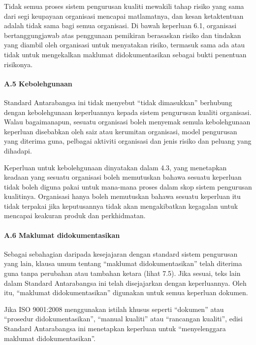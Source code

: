 \documentclass[
]{article}
\begin{document}
Tidak semua proses sistem pengurusan kualiti mewakili tahap risiko yang
sama dari segi keupayaan organisasi mencapai matlamatnya, dan kesan
ketaktentuan adalah tidak sama bagi semua organisasi. Di bawah keperluan
6.1, organisasi bertanggungjawab atas penggunaan pemikiran berasaskan
risiko dan tindakan yang diambil oleh organisasi untuk menyatakan
risiko, termasuk sama ada atau tidak untuk mengekalkan maklumat
didokumentasikan sebagai bukti penentuan risikonya.

\hypertarget{a.5-kebolehgunaan}{%
\paragraph{A.5 Kebolehgunaan}\label{a.5-kebolehgunaan}}

Standard Antarabangsa ini tidak menyebut ``tidak dimasukkan'' berhubung
dengan kebolehgunaan keperluannya kepada sistem pengurusan kualiti
organisasi. Walau bagaimanapun, sesuatu organisasi boleh menyemak semula
kebolehgunaan keperluan disebabkan oleh saiz atau kerumitan organisasi,
model pengurusan yang diterima guna, pelbagai aktiviti organisasi dan
jenis risiko dan peluang yang dihadapi.

Keperluan untuk kebolehgunaan dinyatakan dalam 4.3, yang menetapkan
keadaan yang sesuatu organisasi boleh memutuskan bahawa sesuatu
keperluan tidak boleh diguna pakai untuk mana-mana proses dalam skop
sistem pengurusan kualitinya. Organisasi hanya boleh memutuskan bahawa
sesuatu keperluan itu tidak terpakai jika keputusannya tidak akan
mengakibatkan kegagalan untuk mencapai keakuran produk dan perkhidmatan.

\hypertarget{a.6-maklumat-didokumentasikan}{%
\paragraph{A.6 Maklumat
didokumentasikan}\label{a.6-maklumat-didokumentasikan}}

Sebagai sebahagian daripada kesejajaran dengan standard sistem
pengurusan yang lain, klausa umum tentang ``maklumat didokumentasikan''
telah diterima guna tanpa perubahan atau tambahan ketara (lihat 7.5).
Jika sesuai, teks lain dalam Standard Antarabangsa ini telah
disejajarkan dengan keperluannya. Oleh itu, ``maklumat
didokumentasikan'' digunakan untuk semua keperluan dokumen.

Jika ISO 9001:2008 menggunakan istilah khusus seperti ``dokumen'' atau
``prosedur didokumentasikan'', ``manual kualiti'' atau ``rancangan
kualiti'', edisi Standard Antarabangsa ini menetapkan keperluan untuk
``menyelenggara maklumat didokumentasikan''.
\end{document}
